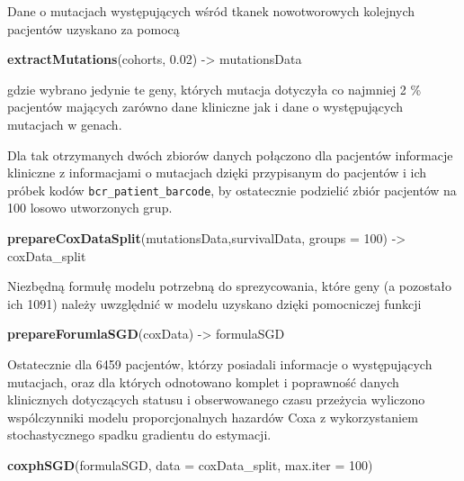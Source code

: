 \documentclass[]{article}
\newenvironment{Shaded}{\begin{snugshade}}{\end{snugshade}}
\newcommand{\KeywordTok}[1]{\textcolor[rgb]{0.13,0.29,0.53}{\textbf{{#1}}}}
\newcommand{\DataTypeTok}[1]{\textcolor[rgb]{0.13,0.29,0.53}{{#1}}}
\newcommand{\DecValTok}[1]{\textcolor[rgb]{0.00,0.00,0.81}{{#1}}}
\newcommand{\FloatTok}[1]{\textcolor[rgb]{0.00,0.00,0.81}{{#1}}}
\newcommand{\StringTok}[1]{\textcolor[rgb]{0.31,0.60,0.02}{{#1}}}
\newcommand{\NormalTok}[1]{{#1}}
\begin{document}
Dane o mutacjach występujących wśród tkanek nowotworowych kolejnych
pacjentów uzyskano za pomocą

\begin{Shaded}
\begin{Highlighting}[]
\KeywordTok{extractMutations}\NormalTok{(cohorts, }\FloatTok{0.02}\NormalTok{) ->}\StringTok{ }\NormalTok{mutationsData }
\end{Highlighting}
\end{Shaded}

gdzie wybrano jedynie te geny, których mutacja dotyczyła co najmniej 2
\% pacjentów mających zarówno dane kliniczne jak i dane o występujących
mutacjach w genach.

Dla tak otrzymanych dwóch zbiorów danych połączono dla pacjentów
informacje kliniczne z informacjami o mutacjach dzięki przypisanym do
pacjentów i ich próbek kodów \texttt{bcr\_patient\_barcode}, by
ostatecznie podzielić zbiór pacjentów na 100 losowo utworzonych grup.

\begin{Shaded}
\begin{Highlighting}[]
\KeywordTok{prepareCoxDataSplit}\NormalTok{(mutationsData,survivalData, }\DataTypeTok{groups =} \DecValTok{100}\NormalTok{) ->}\StringTok{ }\NormalTok{coxData_split}
\end{Highlighting}
\end{Shaded}

Niezbędną formułę modelu potrzebną do sprezycowania, które geny (a
pozostało ich 1091) należy uwzględnić w modelu uzyskano dzięki
pomocniczej funkcji

\begin{Shaded}
\begin{Highlighting}[]
\KeywordTok{prepareForumlaSGD}\NormalTok{(coxData) ->}\StringTok{ }\NormalTok{formulaSGD}
\end{Highlighting}
\end{Shaded}

Ostatecznie dla 6459 pacjentów, którzy posiadali informacje o
występujących mutacjach, oraz dla których odnotowano komplet i
poprawność danych klinicznych dotyczących statusu i obserwowanego czasu
przeżycia wyliczono wspólczynniki modelu proporcjonalnych hazardów Coxa
z wykorzystaniem stochastycznego spadku gradientu do estymacji.

\begin{Shaded}
\begin{Highlighting}[]
\KeywordTok{coxphSGD}\NormalTok{(formulaSGD, }\DataTypeTok{data =} \NormalTok{coxData_split, }\DataTypeTok{max.iter =} \DecValTok{100}\NormalTok{)}
\end{Highlighting}
\end{Shaded}
\end{document}
